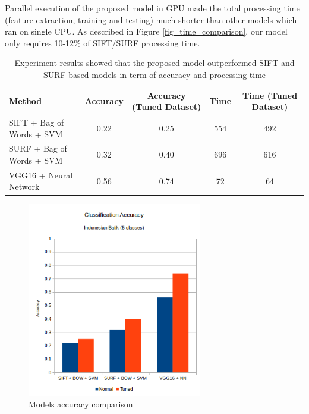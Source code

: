 \documentclass[conference]{IEEEtran}
\begin{document}
Parallel execution of the proposed model in GPU made the total processing time (feature extraction, training and testing) much shorter than other models which ran on single CPU. As described in Figure \ref{fig_time_comparison}, our model only requires 10-12\% of SIFT/SURF processing time.

\begin{table}
\centering
\renewcommand{\arraystretch}{1.5}
\begin{tabular}{|p{5cm}|c|c|c|c|}
\rowcolor{Gray}
\hline \centering \textbf{Method} & \textbf{Accuracy} & \textbf{Accuracy (Tuned Dataset)}  & \textbf{Time} & \textbf{Time (Tuned Dataset)} \\ 
\hline SIFT + Bag of Words + SVM  & 0.22 & 0.25 & 554  & 492 \\ 
\hline SURF + Bag of Words + SVM  & 0.32 & 0.40 & 696 & 616 \\ 
\hline VGG16 + Neural Network & 0.56 & 0.74 & 72 & 64 \\ 
\hline 
\end{tabular}
\caption{Experiment results showed that the proposed model outperformed SIFT and SURF based models in term of accuracy and processing time}
\label{tab_experiment_results}
\end{table}

\begin{figure}
\centering
\includegraphics[width=3.0in]{chart_accuracy}
\caption{Models accuracy comparison}
\label{fig_accuracy_comparison}
\end{figure}
\end{document}

